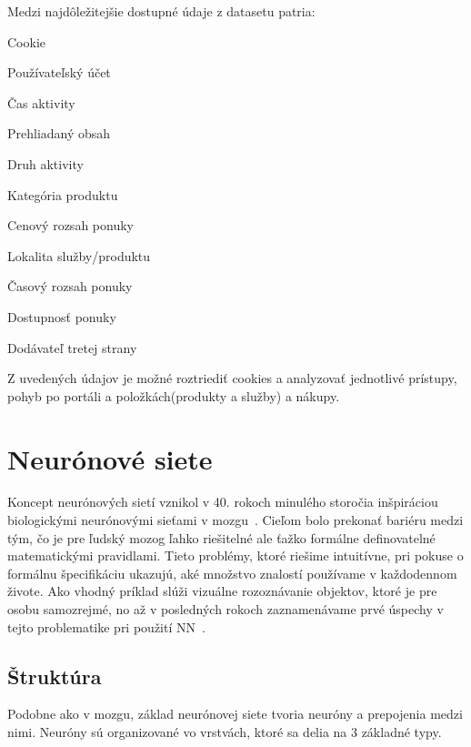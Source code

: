 Medzi najdôležitejšie dostupné údaje z datasetu patria:

\begin{my_itemize}
	\item {Cookie}
	\item {Používateľský účet}
	\item {Čas aktivity}
	\item {Prehliadaný obsah}
	\item {Druh aktivity}
	\item {Kategória produktu}
	\item {Cenový rozsah ponuky}
	\item {Lokalita služby/produktu}
	\item {Časový rozsah ponuky}
	\item {Dostupnosť ponuky}
	\item {Dodávateľ tretej strany}
\end{my_itemize}

Z uvedených údajov je možné roztriediť cookies a analyzovať jednotlivé prístupy, pohyb po portáli a položkách(produkty a služby) a nákupy.

\chapter{Neurónové siete}
\label{analyza_neuronove_siete}

Koncept neurónových sietí vznikol v 40. rokoch minulého storočia inšpiráciou biologickými neurónovými sieťami v mozgu~\cite{mcculloch1943logical}.
Cieľom bolo prekonať bariéru medzi tým, čo je pre ľudský mozog ľahko riešitelné ale ťažko formálne definovatelné matematickými pravidlami. Tieto problémy, ktoré riešime intuitívne, pri pokuse o formálnu špecifikáciu ukazujú, aké množstvo znalostí používame v každodennom živote. Ako vhodný príklad slúži vizuálne rozoznávanie objektov, ktoré je pre osobu samozrejmé, no až v posledných rokoch zaznamenávame prvé úspechy v tejto problematike pri použití NN~\cite{Goodfellow-et-al-2016-Book}.

\section{Štruktúra}
\label{analyza_struktura_nn}

Podobne ako v mozgu, základ neurónovej siete tvoria neuróny a prepojenia medzi nimi. Neuróny sú organizované vo vrstvách, ktoré sa delia na 3 základné typy. 
\noindent


